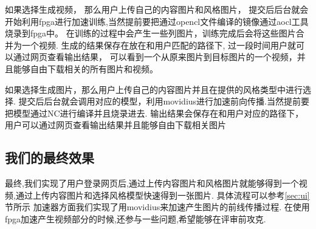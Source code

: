 如果选择生成视频， 那么用户上传自己的内容图片和风格图片，
提交后后台就会开始利用fpga进行加速训练,当然提前要把通过opencl文件编译的镜像通过aocl工具烧录到fpga中。
在训练的过程中会产生一些列图片，训练完成后会将这些图片合并为一个视频.
生成的结果保存在放在和用户匹配的路径下, 过一段时间用户就可以通过网页查看输出结果，
可以看到一个从原来图片到目标图片的一个视频，并且能够自由下载相关的所有图片和视频。

如果选择生成图片，那么用户上传自己的内容图片并且在提供的风格类型中进行选择.
提交后后台就会调用对应的模型，利用movidius进行加速前向传播.当然提前要把模型通过NC进行编译并且烧录进去.
输出结果会保存在和用户对应的路径下，用户可以通过网页查看输出结果并且能够自由下载相关图片

\subsection{我们的最终效果}
最终,我们实现了用户登录网页后,通过上传内容图片和风格图片就能够得到一个视频,通过上传内容图片和选择风格模型快速得到一张图片.
具体流程可以参考\ref{sec:ui}节所示
加速器方面我们实现了用movidius来加速产生图片的前线传播过程.
在使用fpga加速产生视频部分的时候,还参与一些问题,希望能够在评审前攻克.
